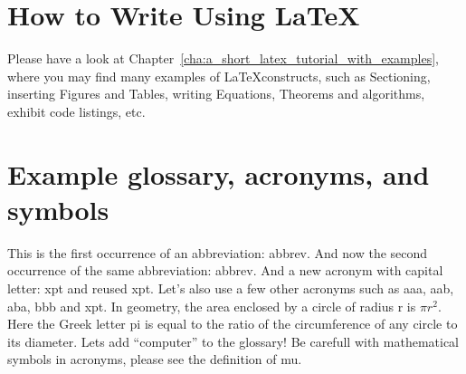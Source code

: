 \begin{xltabular}{\linewidth}{>{\hsize=.4\hsize\raggedright\arraybackslash}X>{\hsize=.6\hsize}X}
    \bottomrule
\end{xltabular}
\egroup


\section{How to Write Using \LaTeX}
\label{sec:how_to_write_using_latex}

Please have a look at Chapter~\ref{cha:a_short_latex_tutorial_with_examples}, where you may find many examples of \LaTeX constructs, such as Sectioning, inserting Figures and Tables, writing Equations, Theorems and algorithms, exhibit code listings, etc.




\section{Example glossary, acronyms, and symbols}
%
%
This is the first occurrence of an abbreviation: \gls{abbrev}. And now the second occurrence of the same abbreviation: \gls{abbrev}. And a new acronym with capital letter: \Gls{xpt} and reused \gls{xpt}.  Let's also use a few other acronyms such as \gls{aaa}, \gls{aab}, \gls{aba}, \gls{bbb} and \gls{xpt}.
In geometry, the area enclosed by a circle of radius \gls{r} is $\pi r^2$. Here the Greek letter \gls{pi} is equal to the ratio of the circumference of any circle to its diameter.
Lets add ``\gls{computer}'' to the glossary! Be carefull with mathematical symbols in acronyms, please see the definition of \gls{mu}.


